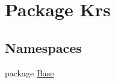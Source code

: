 \hypertarget{namespace_krs}{\section{Package Krs}
\label{namespace_krs}
}
\subsection*{Namespaces}
\begin{DoxyCompactItemize}
\item 
package \hyperlink{namespace_krs_1_1_base}{Base}
\end{DoxyCompactItemize}
